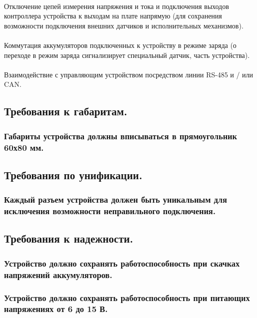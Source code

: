 \documentclass[pdftex,14pt,a4paper,russian,utf8]{article}
\begin{document}
\paragraph{}{Отключение цепей измерения напряжения и тока и подключения выходов контроллера устройства к выходам на плате напрямую (для сохранения возможности подключения внешних датчиков и исполнительных механизмов).}
\paragraph{}{Коммутация аккумуляторов подключенных к устройству в режиме заряда (о переходе в режим заряда сигнализирует специальный датчик, часть устройства).}
\paragraph{}{Взаимодействие с управляющим устройством посредством линии RS-485 и / или CAN.}
\subsection{Требования к габаритам.}
\subsubsection{Габариты устройства должны вписываться в прямоугольник 60х80 мм.}
\subsection{Требования по унификации.}
\subsubsection{Каждый разъем устройства должен быть уникальным для исключения возможности неправильного подключения.}
\subsection{Требования к надежности.}
\subsubsection{Устройство должно сохранять работоспособность при скачках напряжений аккумуляторов.}
\subsubsection{Устройство должно сохранять работоспособность при питающих напряжениях от 6 до 15 В.}
\end{document}
